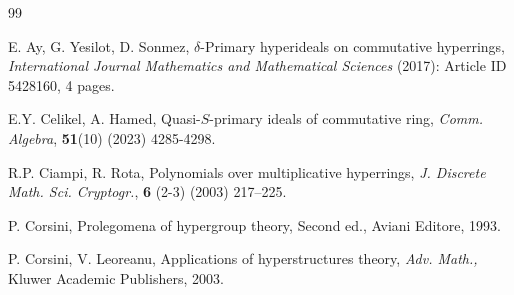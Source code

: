 \documentclass[preprint,review,10pt]{amsart}
\theoremstyle{definition}
\theoremstyle{remark}
\numberwithin{equation}{section}
\begin{document}
\begin{thebibliography}{99}












E. Ay, G. Yesilot, D. Sonmez, $\delta$-Primary hyperideals on commutative hyperrings, {\it International Journal Mathematics and Mathematical Sciences}  (2017): Article ID 5428160, 4 pages.





E.Y. Celikel, A. Hamed, Quasi-$S$-primary ideals of commutative ring, {\it Comm. Algebra}, {\bf 51}(10) (2023) 4285-4298.

R.P. Ciampi, R. Rota, Polynomials over multiplicative hyperrings, {\it J.
Discrete Math. Sci. Cryptogr.}, {\bf 6} (2-3) (2003) 217–225.



P. Corsini, Prolegomena of hypergroup theory, Second ed., Aviani Editore, 1993.

P. Corsini, V. Leoreanu, Applications of hyperstructures theory, {\it Adv. Math.,} Kluwer Academic Publishers, 2003.



\end{thebibliography}
\end{document}
